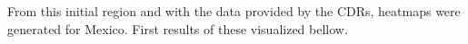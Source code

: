 From this initial region and with the data provided by the CDRs, heatmaps were generated for Mexico. First results of these visualized bellow.